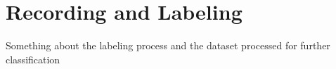 \section{Recording and Labeling} \label{sec:disc_RecordingAndLabeling}

Something about the labeling process and the dataset processed for further classification